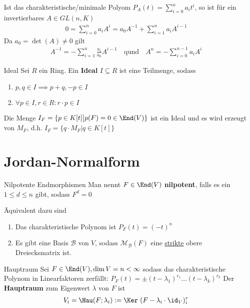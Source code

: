 Ist das charakteristische/minimale Polyom $P_A(t) = \sum_{i = 0}^{n}a_i t^i$, so ist für ein invertierbares $A \in GL(n,K)$
\begin{align*}
    0 = \sum_{i = 0}^{n}a_i A^{i} =  a_0 A^{-1} + \sum_{i = 1}^{n} a_i A^{i-1}
\end{align*}
Da $a_0 = \det(A) \neq 0$ gilt
\begin{align*}
    A^{-1} = - \sum_{i = 1}^{n} \frac{a_i}{a_0}A^{i-1} \quad \text{qund} \quad  A^n = -\sum_{i = 0}^{n-1} a_i A^i
\end{align*}

\begin{definition}{Ideal}
    Sei $R$ ein Ring. Ein \textbf{Ideal} $I \subseteq R$ ist eine Teilmenge, sodass
    \begin{enumerate}
        \item   $p,q \in I \implies p+q, -p \in I$
        \item   $\forall p \in I, r \in R: r \cdot p \in I$     
    \end{enumerate}
    Die Menge $I_F = \{p \in K[t] \big\vert p(F) = 0 \in \End(V)\}$ ist ein Ideal und es wird erzeugt von $M_F$, d.h. $I_F = \{q \cdot M_F \big\vert q \in K[t]\}$
\end{definition}

\section{Jordan-Normalform}

\begin{definition}{Nilpotente Endmorphismen}
    Man nennt $F \in \End(V)$ \textbf{nilpotent}, falls es ein $1 \leq d \leq n$ gibt, sodass $F^d = 0$
\end{definition}
Äquivalent dazu sind
\begin{enumerate}
    \item	Das charakteristische Polynom ist $P_F(t) = (-t)^n$
    \item   Es gibt eine Basis $\mathcal{B}$ von $V$, sodass $\mathcal{M}_{\mathcal{B}}(F)$ eine \underline{strikte} obere Dreiecksmatrix ist.
\end{enumerate}

\begin{definition}{Hauptraum}
    Sei $F \in \End(V), \dim V = n < \infty$ sodass das charakteristische Polynom in Linearfaktoren zerfällt: $P_F(t) = \pm(t- \lambda_1)^{r_1} \dots (t- \lambda_k)^{r_k}$
    Der \textbf{Hauptraum} zum Eigenwert $\lambda$ von $F$ ist
    \begin{align*}
        V_i = \Hau(F;\lambda_i) := \Ker\ (F - \lambda_i \cdot \id_V)^r_i
    \end{align*}
\end{definition}


